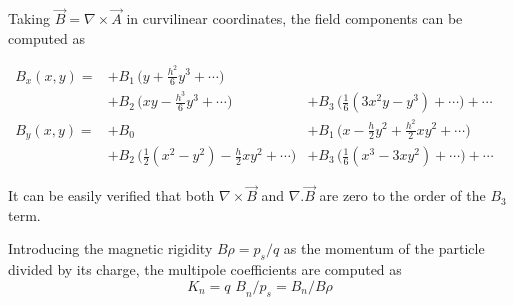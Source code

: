 Taking \(\vec{B} = \nabla \times \vec{A}\) in curvilinear coordinates,
the field components can be computed as  

\[
\begin{aligned}
B_x(x,y) =
&+ B_1\,\Big(y+\frac{h^2}{6}y^3+\cdots\Big)&  &  \\
&+ B_2\,\Big(xy - \frac{h^3}{6}y^3+\cdots \Big)&+B_3\,\Big(\frac{1}{6}(3x^2y-y^3)+ \cdots \Big)+\cdots\\
B_y(x,y)=
&+ B_0 & + B_1\,\Big(x-\frac{h}{2}y^2+\frac{h^2}{2}xy^2+\cdots \Big)\\
&+ B_2\,\Big(\frac{1}{2}(x^2-y^2)-\frac{h}{2}xy^2+\cdots \Big) & + B_3\,\Big(\frac{1}{6}(x^3-3xy^2)+ \cdots \Big)+\cdots
\end{aligned}
\]

It can be easily verified that both \(\nabla \times \vec{\textit{B}}\)
and \(\nabla . \vec{\textit{B}}\) are zero to the order of the
\(\textit{B}_3\) term.  

Introducing the magnetic rigidity \(\textit{B}\rho = p_s / q\) as the
momentum of the particle divided by its charge, the multipole
coefficients are computed as   
\[ \textit{K}_n = \textit{q B}_n / \textit{p}_s  =  \textit{B}_n / \textit{B} \rho \] 



